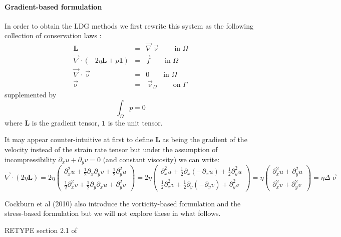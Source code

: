 \paragraph{Gradient-based formulation} In order to obtain the LDG methods we first rewrite this system as the following collection of conservation 
laws \cite{coks02}:
\begin{eqnarray}
{\bm L} &=& \vec\nabla \vec\upnu  \qquad \textrm{in } \Omega\\
\vec\nabla\cdot (-2\eta {\bm L} + p {\bm 1}) &=& \vec{f}  \qquad \textrm{in } \Omega\\
\vec\nabla\cdot\vec\upnu &=& 0 \qquad \textrm{in } \Omega\\
\vec{\upnu} &=& \vec{\upnu}_D \qquad \textrm{on } \Gamma
\end{eqnarray}
supplemented by
\[
\int_\Omega p =0
\]
where ${\bm L}$ is the gradient tensor, ${\bm 1}$ is the unit tensor. 
\begin{remark}
It may appear counter-intuitive at first to define ${\bm L}$ as being the gradient
of the velocity instead of the strain rate tensor but under the assumption
of incompressibility $\partial_x u + \partial_y v =0$ (and constant viscosity) we can write:
\[
\vec\nabla\cdot (2 \eta {\bm L}) = 
2\eta
\left(
\begin{array}{c}
\partial_x^2 u + \frac{1}{2}\partial_x\partial_y v + \frac{1}{2}\partial_y^2 u \\
\frac{1}{2}\partial_x^2 v + \frac{1}{2} \partial_y\partial_x u + \partial_y^2 v
\end{array}
\right)
=
2\eta
\left(
\begin{array}{c}
\partial_x^2 u + \frac{1}{2}\partial_x(-\partial_x u) + \frac{1}{2}\partial_y^2 u \\
\frac{1}{2}\partial_x^2 v + \frac{1}{2} \partial_y(-\partial_y v) + \partial_y^2 v
\end{array}
\right)
=
\eta
\left(
\begin{array}{c}
\partial_x^2 u + \partial_y^2 u \\
\partial_x^2 v + \partial_y^2 v
\end{array}
\right)
=
\eta \Delta \vec\upnu
\]
\end{remark}


\begin{remark}
Cockburn et al (2010) \cite{conp10} also introduce the vorticity-based formulation and the stress-based 
formulation but we will not explore these in what follows.
\end{remark}

RETYPE section 2.1 of \cite{coks02}

